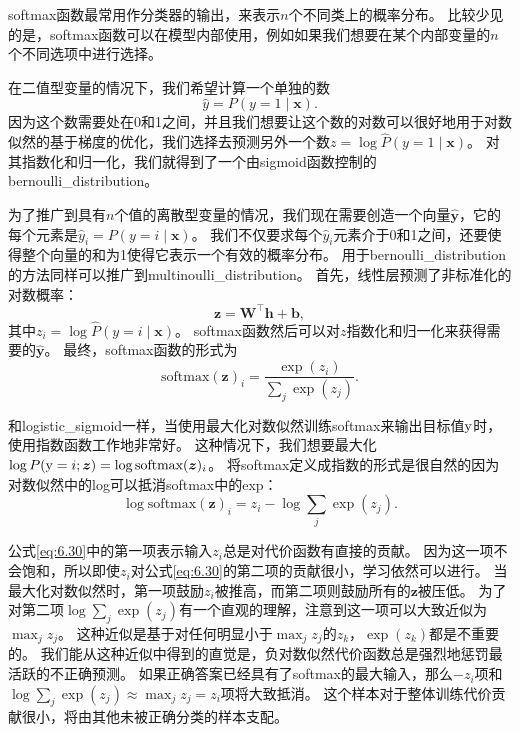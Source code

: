 
softmax函数最常用作分类器的输出，来表示$n$个不同类上的概率分布。
比较少见的是，softmax函数可以在模型内部使用，例如如果我们想要在某个内部变量的$n$个不同选项中进行选择。

在二值型变量的情况下，我们希望计算一个单独的数
\begin{equation}
\hat{y} = P(y=1\mid\bm{x}).
\end{equation}
因为这个数需要处在0和1之间，并且我们想要让这个数的对数可以很好地用于对数似然的基于梯度的优化，我们选择去预测另外一个数$z=\log \hat{P}(y=1\mid\bm{x})$。
对其指数化和归一化，我们就得到了一个由\gls{sigmoid}函数控制的\gls{bernoulli_distribution}。

为了推广到具有$n$个值的离散型变量的情况，我们现在需要创造一个向量$\hat{\bm{y}}$，它的每个元素是$\hat{y}_i = P(y=i\mid\bm{x})$。
我们不仅要求每个$\hat{y}_i$元素介于0和1之间，还要使得整个向量的和为1使得它表示一个有效的概率分布。
用于\gls{bernoulli_distribution}的方法同样可以推广到\gls{multinoulli_distribution}。
首先，线性层预测了非标准化的对数概率：
\begin{equation}
\bm{z} = \bm{W}^\top \bm{h}+\bm{b},
\end{equation}
其中$z_i=\log \hat{P}(y=i\mid\bm{x})$。
softmax函数然后可以对$z$指数化和归一化来获得需要的$\hat{\bm{y}}$。
最终，softmax函数的形式为
\begin{equation}
\text{softmax}(\bm{z})_i = \frac{\exp(z_i)}{\sum_j \exp(z_j)}.
\end{equation}

和\gls{logistic_sigmoid}一样，当使用最大化对数似然训练softmax来输出目标值$\mathrm{y}$时，使用指数函数工作地非常好。
这种情况下，我们想要最大化$\log P(\mathrm{y} =i; \bm{z})=\log \text{softmax}(\bm{z})_i$。
将softmax定义成指数的形式是很自然的因为对数似然中的log可以抵消softmax中的exp：
\begin{equation}
\log \text{softmax}(\bm{z})_i = z_i - \log \sum_j \exp(z_j).
\label{eq:6.30}
\end{equation}


公式\ref{eq:6.30}中的第一项表示输入$z_i$总是对代价函数有直接的贡献。
因为这一项不会饱和，所以即使$z_i$对公式\ref{eq:6.30}的第二项的贡献很小，学习依然可以进行。
当最大化对数似然时，第一项鼓励$z_i$被推高，而第二项则鼓励所有的$\bm{z}$被压低。
为了对第二项$\log \sum_j \exp(z_j)$有一个直观的理解，注意到这一项可以大致近似为$\max_j z_j$。
这种近似是基于对任何明显小于$\max_j z_j$的$z_k$，$\exp(z_k)$都是不重要的。
我们能从这种近似中得到的直觉是，负对数似然代价函数总是强烈地惩罚最活跃的不正确预测。
如果正确答案已经具有了softmax的最大输入，那么$-z_i$项和$\log\sum_j \exp(z_j) \approx \max_j z_j = z_i$项将大致抵消。
这个样本对于整体训练代价贡献很小，将由其他未被正确分类的样本支配。


